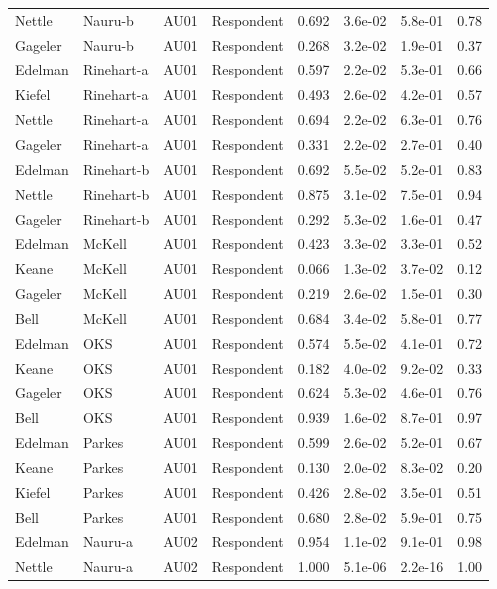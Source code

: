 \documentclass{monashthesis}
\begin{document}
\begin{center}
\begin{longtable}{llllllll}
Nettle & Nauru-b & AU01 & Respondent & 0.692 & 3.6e-02 & 5.8e-01 & 0.78 \\
Gageler & Nauru-b & AU01 & Respondent & 0.268 & 3.2e-02 & 1.9e-01 & 0.37 \\
Edelman & Rinehart-a & AU01 & Respondent & 0.597 & 2.2e-02 & 5.3e-01 & 0.66 \\
Kiefel & Rinehart-a & AU01 & Respondent & 0.493 & 2.6e-02 & 4.2e-01 & 0.57 \\
Nettle & Rinehart-a & AU01 & Respondent & 0.694 & 2.2e-02 & 6.3e-01 & 0.76 \\
Gageler & Rinehart-a & AU01 & Respondent & 0.331 & 2.2e-02 & 2.7e-01 & 0.40 \\
Edelman & Rinehart-b & AU01 & Respondent & 0.692 & 5.5e-02 & 5.2e-01 & 0.83 \\
Nettle & Rinehart-b & AU01 & Respondent & 0.875 & 3.1e-02 & 7.5e-01 & 0.94 \\
Gageler & Rinehart-b & AU01 & Respondent & 0.292 & 5.3e-02 & 1.6e-01 & 0.47 \\
Edelman & McKell & AU01 & Respondent & 0.423 & 3.3e-02 & 3.3e-01 & 0.52 \\
Keane & McKell & AU01 & Respondent & 0.066 & 1.3e-02 & 3.7e-02 & 0.12 \\
Gageler & McKell & AU01 & Respondent & 0.219 & 2.6e-02 & 1.5e-01 & 0.30 \\
Bell & McKell & AU01 & Respondent & 0.684 & 3.4e-02 & 5.8e-01 & 0.77 \\
Edelman & OKS & AU01 & Respondent & 0.574 & 5.5e-02 & 4.1e-01 & 0.72 \\
Keane & OKS & AU01 & Respondent & 0.182 & 4.0e-02 & 9.2e-02 & 0.33 \\
Gageler & OKS & AU01 & Respondent & 0.624 & 5.3e-02 & 4.6e-01 & 0.76 \\
Bell & OKS & AU01 & Respondent & 0.939 & 1.6e-02 & 8.7e-01 & 0.97 \\
Edelman & Parkes & AU01 & Respondent & 0.599 & 2.6e-02 & 5.2e-01 & 0.67 \\
Keane & Parkes & AU01 & Respondent & 0.130 & 2.0e-02 & 8.3e-02 & 0.20 \\
Kiefel & Parkes & AU01 & Respondent & 0.426 & 2.8e-02 & 3.5e-01 & 0.51 \\
Bell & Parkes & AU01 & Respondent & 0.680 & 2.8e-02 & 5.9e-01 & 0.75 \\
Edelman & Nauru-a & AU02 & Respondent & 0.954 & 1.1e-02 & 9.1e-01 & 0.98 \\
Nettle & Nauru-a & AU02 & Respondent & 1.000 & 5.1e-06 & 2.2e-16 & 1.00 \\

\end{longtable}
\end{center}
\end{document}
